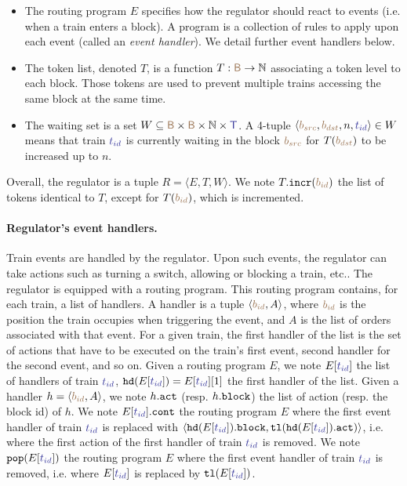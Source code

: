\documentclass[runningheads]{llncs}
\newcommand{\Nat}{{\mbox{$\mathbb{N}$}}}
\newcommand{\tuple}[1]{\ensuremath{\langle #1\rangle}}
\newcommand{\posFmt}[1]{{\color{poscolor}{#1}}}
\newcommand{\blocks}{{\posFmt{\mathsf{B}}}}
\newcommand{\bid}[1]{\ensuremath{\posFmt{b_{#1}}}}
\newcommand{\trainFmt}[1]{{\color{traincolor} #1}}
\newcommand{\trains}{{\trainFmt{\mathsf{T}}}}
\newcommand{\tid}[1]{\ensuremath{\trainFmt{t_{#1}}}}
\newcommand{\handlerOf}[2]{\ensuremath{#1[\trainFmt{#2}]}}
\newcommand{\popHandlerHead}[2]{\ensuremath{{\tt pop}(#1[\trainFmt{#2}])}}
\newcommand{\actionsOf}[1]{\ensuremath{#1.{\tt act}}}
\newcommand{\blockOf}[1]{\ensuremath{#1.{\tt block}}}
\newcommand{\handler}[2]{\tuple{#1, #2}}
\newcommand{\nextAct}[1]{\ensuremath{#1.{\tt cont}}}
\newcommand{\regTuple}[3]{\tuple{#1, #2, #3}}
\newcommand{\tokens}{\ensuremath{T}}
\newcommand{\tokenOf}[1]{\ensuremath{T(\posFmt{#1})}}
\newcommand{\incrToken}[2]{\ensuremath{#1. {\tt incr}(\posFmt{#2})}}
\newcommand{\bufferFmt}[1]{#1}
\newcommand{\head}[1]{\ensuremath{{\tt hd}(#1)}}
\newcommand{\buftail}[1]{\ensuremath{{\tt tl}(\bufferFmt{#1})}}
\begin{document}
\begin{itemize}
	\item The routing program $E$ specifies how the regulator should react to events (i.e. when a train enters a block). A program is a collection of rules to apply upon each event (called an \emph{event handler}). We detail further event handlers below.
	\item The token list, denoted $\tokens$, is a function  $\tokens: \blocks \to \Nat$ associating a token level to each block. Those tokens are used to prevent multiple trains accessing the same block at the same time.
	\item The waiting set is a set $W \subseteq \blocks \times \blocks \times \Nat \times \trains$. A 4-tuple $\tuple{\bid{src}, \bid{dst}, n, \tid{id}} \in W$ means that train \tid{id} is currently waiting in the block \bid{src} for $\tokenOf{\bid{dst}}$ to be increased up to $n$.
\end{itemize}

Overall, the regulator is a tuple $R = \regTuple{E}{\tokens}{W}$. We note $\incrToken{T}{\bid{id}}$ the list of tokens identical to $T$, except for $\tokenOf{\bid{id}}$, which is incremented.

\paragraph{Regulator's event handlers.}

Train events are handled by the regulator. Upon such events, the regulator can take actions such as turning a switch, allowing or blocking a train, etc.. The regulator is equipped with a routing program. This routing program contains, for each train, a list of handlers. A handler is a tuple $\tuple{\bid{id}, A}$, where $\bid{id}$ is the position the train occupies when triggering the event, and $A$ is the list of orders associated with that event. For a given train, the first handler of the list is the set of actions that have to be executed on the train's first event, second handler for the second event, and so on.
Given a routing program $E$, we note $\handlerOf{E}{\tid{id}}$ the list of handlers of train $\tid{id}$, $\head{\handlerOf{E}{\tid{id}}} = \handlerOf{E}{\tid{id}}[1]$ the first handler of the list. Given a handler $h = \tuple{\bid{id}, A}$, we note $\actionsOf{h}$ (resp. \blockOf{h}) the list of action (resp. the block id) of $h$. We note $\nextAct{\handlerOf{E}{\tid{id}}}$ the routing program $E$ where the first event handler of train $\tid{id}$ is replaced with $\handler{\blockOf{\head{\handlerOf{E}{\tid{id}}}}}{\buftail{\actionsOf{\head{\handlerOf{E}{\tid{id}}}}}}$, i.e. where the first action of the first handler of train \tid{id} is removed. We note $\popHandlerHead{E}{\tid{id}}$ the routing program $E$ where the first event handler of train \tid{id} is removed, i.e. where $\handlerOf{E}{\tid{id}}$ is replaced by $\buftail{\handlerOf{E}{\tid{id}}}$.
\end{document}
